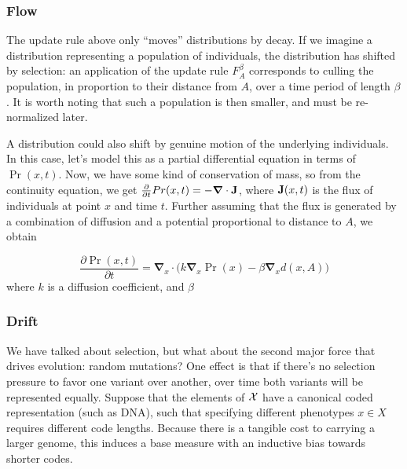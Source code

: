 \documentclass{article}
\begin{document}
\subsubsection{Flow}
\def\vgrad{\boldsymbol\nabla}
The update rule above only ``moves'' distributions by decay. If we imagine a distribution representing a population of individuals, the distribution has shifted by selection: an application of the update rule $F_A^\beta$ corresponds to culling the population, in proportion to their distance from $A$, over a time period of length $\beta$.
It is worth noting that such a population is then smaller, and must be re-normalized later.

A distribution could also shift by genuine motion of the underlying individuals.
In this case, let's model this as a partial differential equation in terms of $\Pr(x,t)$.
Now, we have some kind of conservation of mass, so from the continuity equation, we get
$\frac{\partial }{\partial t}Pr(x,t) = - \vgrad \cdot \mat J$,
where $\mathbf{J}(x,t)$ is the flux of individuals at point $x$ and time $t$.
Further assuming that the flux is generated by a combination of diffusion and a potential proportional to distance to $A$, we obtain

\[
    \frac{\partial \Pr(x, t)}{\partial t} = \vgrad_{\!x} \cdot \Big( k \vgrad_{\!x} \Pr (x) - \beta \vgrad_{\!x} d(x, A) \Big)
\]
where $k$ is a diffusion coefficient, and $\beta$



\subsubsection{Drift}
We have talked about selection, but what about the second major force that drives evolution: random mutations?
One effect is that if there's no selection pressure to favor one variant over another, over time both variants will be represented equally.
Suppose that the elements of $\mathcal X$ have a canonical coded representation (such as DNA), such that specifying different phenotypes $x \in X$ requires different code lengths.
Because there is a tangible cost to carrying a larger genome, this induces a base measure with an inductive bias towards shorter codes.
\end{document}
